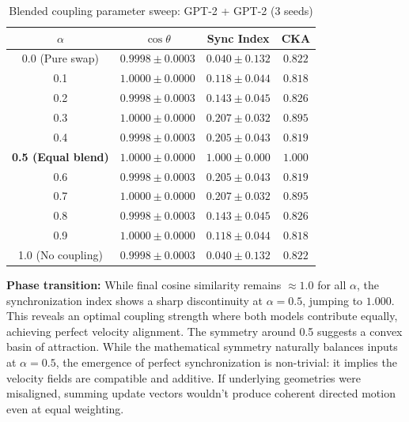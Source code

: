 \documentclass[10pt]{article} %
\theoremstyle{plain}
\theoremstyle{definition}
\theoremstyle{remark}
\begin{document}
\begin{table}[htbp]
\centering
\caption{Blended coupling parameter sweep: GPT-2 + GPT-2 (3 seeds)}
\label{tab:phase_transition}
\small
\begin{tabular}{cccc}
\toprule
\textbf{$\alpha$} & \textbf{$\cos \theta$} & \textbf{Sync Index} & \textbf{CKA} \\
\midrule
0.0 (Pure swap) & $0.9998 \pm 0.0003$ & $0.040 \pm 0.132$ & $0.822$ \\
0.1 & $1.0000 \pm 0.0000$ & $0.118 \pm 0.044$ & $0.818$ \\
0.2 & $0.9998 \pm 0.0003$ & $0.143 \pm 0.045$ & $0.826$ \\
0.3 & $1.0000 \pm 0.0000$ & $0.207 \pm 0.032$ & $0.895$ \\
0.4 & $0.9998 \pm 0.0003$ & $0.205 \pm 0.043$ & $0.819$ \\
\textbf{0.5 (Equal blend)} & $\mathbf{1.0000 \pm 0.0000}$ & $\mathbf{1.000 \pm 0.000}$ & $\mathbf{1.000}$ \\
0.6 & $0.9998 \pm 0.0003$ & $0.205 \pm 0.043$ & $0.819$ \\
0.7 & $1.0000 \pm 0.0000$ & $0.207 \pm 0.032$ & $0.895$ \\
0.8 & $0.9998 \pm 0.0003$ & $0.143 \pm 0.045$ & $0.826$ \\
0.9 & $1.0000 \pm 0.0000$ & $0.118 \pm 0.044$ & $0.818$ \\
1.0 (No coupling) & $0.9998 \pm 0.0003$ & $0.040 \pm 0.132$ & $0.822$ \\
\bottomrule
\end{tabular}
\end{table}

\textbf{Phase transition:} While final cosine similarity remains $\approx 1.0$ for all $\alpha$, the synchronization index shows a sharp discontinuity at $\alpha = 0.5$, jumping to $1.000$. This reveals an optimal coupling strength where both models contribute equally, achieving perfect velocity alignment. The symmetry around 0.5 suggests a convex basin of attraction. While the mathematical symmetry naturally balances inputs at $\alpha=0.5$, the emergence of perfect synchronization is non-trivial: it implies the velocity fields are compatible and additive. If underlying geometries were misaligned, summing update vectors wouldn't produce coherent directed motion even at equal weighting.

\end{document}
